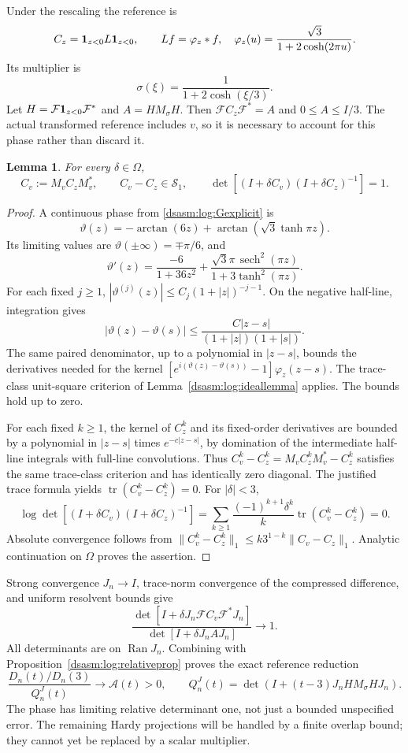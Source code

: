 \documentclass[11pt,letterpaper]{article}
\newtheorem{lemma}[theorem]{Lemma}
\theoremstyle{remark}\newtheorem{remark}[theorem]{Remark}
\newcommand{\Sone}{\mathcal S_1}\newcommand{\Stwo}{\mathcal S_2}
\DeclareMathOperator{\tr}{tr}\DeclareMathOperator{\Ran}{Ran}
\begin{document}
Under the rescaling the reference is
\[
 C_z=\mathbf1_{z<0}L\mathbf1_{z<0},\qquad
 Lf=\varphi_z*f,\quad
 \varphi_z(u)=\frac{\sqrt3}{1+2\cosh(2\pi u)}.
\]
Its multiplier is
\begin{equation}\label{dsasm:log:sigmadef}
 \sigma(\xi)=\frac1{1+2\cosh(\xi/3)}.
\end{equation}
Let $H=\mathcal F\mathbf1_{z<0}\mathcal F^*$ and $A=HM_\sigma H$.
Then $\mathcal FC_z\mathcal F^*=A$ and $0\le A\le I/3$.
The actual transformed reference includes $v$, so it is necessary
to account for this phase rather than discard it.

\begin{lemma}\label{dsasm:log:phaselemma}
For every $\delta\in\Omega$,
\[
 C_v:=M_vC_zM_v^*,\qquad C_v-C_z\in\Sone,\qquad
 \det[(I+\delta C_v)(I+\delta C_z)^{-1}]=1.
\]
\end{lemma}
\begin{proof}
A continuous phase from \eqref{dsasm:log:Gexplicit} is
\[
 \vartheta(z)=-\arctan(6z)+\arctan(\sqrt3\tanh\pi z).
\]
Its limiting values are $\vartheta(\pm\infty)=\mp\pi/6$, and
\[
 \vartheta'(z)=\frac{-6}{1+36z^2}
       +\frac{\sqrt3\pi\,\operatorname{sech}^2(\pi z)}
                    {1+3\tanh^2(\pi z)}.
\]
For each fixed $j\ge1$, $|\vartheta^{(j)}(z)|\le C_j(1+|z|)^{-j-1}$.
On the negative half-line, integration gives
\[
 |\vartheta(z)-\vartheta(s)|
 \le\frac{C|z-s|}{(1+|z|)(1+|s|)}.
\]
The same paired denominator, up to a polynomial in $|z-s|$, bounds
the derivatives needed for the kernel
$[e^{i(\vartheta(z)-\vartheta(s))}-1]\varphi_z(z-s)$.
The trace-class unit-square criterion of Lemma~\ref{dsasm:log:ideallemma}
applies. The bounds hold up to zero.

For each fixed $k\ge1$, the kernel of $C_z^k$ and its fixed-order
derivatives are bounded by a polynomial in $|z-s|$ times
$e^{-c|z-s|}$, by domination of the intermediate half-line
integrals with full-line convolutions. Thus
$C_v^k-C_z^k=M_vC_z^kM_v^*-C_z^k$ satisfies the same trace-class
criterion and has identically zero diagonal. The justified trace
formula yields $\tr(C_v^k-C_z^k)=0$. For $|\delta|<3$,
\[
 \log\det[(I+\delta C_v)(I+\delta C_z)^{-1}]
 =\sum_{k\ge1}\frac{(-1)^{k+1}\delta^k}{k}\tr(C_v^k-C_z^k)=0.
\]
Absolute convergence follows from
$\|C_v^k-C_z^k\|_1\le k3^{1-k}\|C_v-C_z\|_1$.
Analytic continuation on $\Omega$ proves the assertion.
\end{proof}

Strong convergence $J_n\to I$, trace-norm convergence of the
compressed difference, and uniform resolvent bounds give
\[
 \frac{\det[I+\delta J_n\mathcal FC_v\mathcal F^*J_n]}
      {\det[I+\delta J_n A J_n]}\longrightarrow1.
\]
All determinants are on $\Ran J_n$. Combining with
Proposition~\ref{dsasm:log:relativeprop} proves the exact reference reduction
\begin{equation}\label{dsasm:log:jacobirelative}
 \frac{D_n(t)/D_n(3)}{Q_n^J(t)}\longrightarrow\mathcal A(t)>0,
 \qquad Q_n^J(t)=\det(I+(t-3)J_nHM_\sigma HJ_n).
\end{equation}
The phase has limiting relative determinant one, not just a bounded
unspecified error. The remaining Hardy projections will be handled
by a finite overlap bound; they cannot yet be replaced by a scalar
multiplier.
\end{document}
